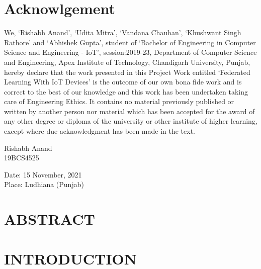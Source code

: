 \documentclass[14pt]{extarticle}
\newcommand\mainmatter{
    \cleardoublepage
    \pagenumbering{arabic}
}
\begin{document}
\restoregeometry

\newpage
{}
\section*{Acknowlgement}

We, ‘Rishabh Anand’, ‘Udita Mitra’, ‘Vandana Chauhan’, ‘Khushwant Singh Rathore’ and ‘Abhishek Gupta’, student of ‘Bachelor of Engineering in Computer Science and Engineering - IoT’, session:2019-23, Department of Computer Science and Engineering, Apex Institute of Technology, Chandigarh University, Punjab, hereby declare that the work presented in this Project Work entitled ‘Federated Learning With IoT Devices’ is the outcome of our own bona fide work and is correct to the best of our knowledge and this work has been undertaken taking care of Engineering Ethics. It contains no material previously published or written by another person nor material which has been accepted for the award of any other degree or diploma of the university or other institute of higher learning, except where due acknowledgment has been made in the text.

\vspace{5em}
\begin{flushright}
    Rishabh Anand\\
    19BCS4525
\end{flushright}

\vspace{13em}
Date: 15 November, 2021 \\
 
Place: Ludhiana (Punjab)\\

\newpage
{}
\listoffigures

\newpage
{}
\section*{ABSTRACT}
\onehalfspacing

\setlength{\parskip}{0em}

\newpage
{}
\begin{center}
    \tableofcontents
\end{center}

\mainmatter

\setlength{\parskip}{1em}

\newpage
\section{INTRODUCTION}
\end{document}
